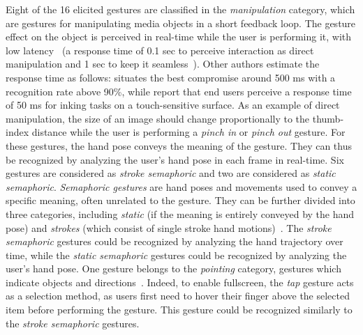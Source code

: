 Eight of the 16 elicited gestures are classified in the \textit{manipulation} category, which are gestures for manipulating media objects in a short feedback loop. The gesture effect on the object is perceived in real-time while the user is performing it, with low latency~\cite{Aigner:2012} (\eg a response time of 0.1 sec to perceive interaction as direct manipulation and 1 sec to keep it seamless~\cite{Nielsen:1994}).
Other authors estimate the response time as follows: \cite{Chen:2017} situates the best compromise around 500 ms with a recognition rate above 90\%, while \cite{Annett:2014} report that end users perceive a response time of 50 ms for inking tasks on a touch-sensitive surface.
As an example of direct manipulation, the size of an image should change proportionally to the thumb-index distance while the user is performing a \textit{pinch in} or \textit{pinch out} gesture. For these gestures, the hand pose conveys the meaning of the gesture. They can thus be recognized by analyzing the user's hand pose in each frame in real-time. Six gestures are considered as \textit{stroke semaphoric} and two are considered as \textit{static semaphoric}. \textit{Semaphoric gestures} are hand poses and movements used to convey a specific meaning, often unrelated to the gesture. They can be further divided into three categories, including \textit{static} (if the meaning is entirely conveyed by the hand pose) and \textit{strokes} (which consist of single stroke hand motions)~\cite{Aigner:2012}. The \textit{stroke semaphoric} gestures could be recognized by analyzing the hand trajectory over time, while the \textit{static semaphoric} gestures could be recognized by analyzing the user's hand pose.
One gesture belongs to the \textit{pointing} category, \ie gestures which indicate objects and directions~\cite{Aigner:2012}. Indeed, to enable fullscreen, the \textit{tap} gesture acts as a selection method, as users first need to hover their finger above the selected item before performing the gesture. This gesture could be recognized similarly to the \textit{stroke semaphoric} gestures.


